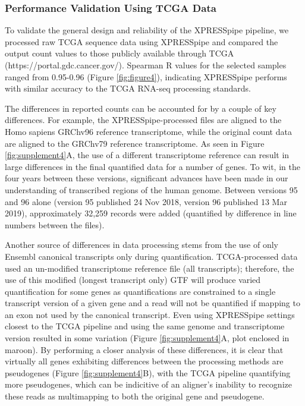 \documentclass[10pt, oneside]{article}
\begin{document}
\subsubsection{Performance Validation Using TCGA Data}
To validate the general design and reliability of the XPRESSpipe pipeline, we processed raw TCGA sequence data using XPRESSpipe and compared the output count values to those publicly available through TCGA (https://portal.gdc.cancer.gov/). Spearman R values for the selected samples ranged from 0.95-0.96 (Figure \ref{fig:figure4}), indicating XPRESSpipe performs with similar accuracy to the TCGA RNA-seq processing standards. \par

The differences in reported counts can be accounted for by a couple of key differences. For example, the XPRESSpipe-processed files are aligned to the Homo sapiens GRChv96 reference transcriptome, while the original count data are aligned to the GRChv79 reference transcriptome. As seen in Figure \ref{fig:supplement4}A, the use of a different transcriptome reference can result in large differences in the final quantified data for a number of genes. To wit, in the four years between these versions, significant advances have been made in our understanding of transcribed regions of the human genome. Between versions 95 and 96 alone (version 95 published 24 Nov 2018, version 96 published 13 Mar 2019), approximately 32,259 records were added (quantified by difference in line numbers between the files). \par

Another source of differences in data processing stems from the use of only Ensembl canonical transcripts only during quantification. TCGA-processed data used an un-modified transcriptome reference file (all transcripts); therefore, the use of this modified (longest transcript only) GTF will produce varied quantification for some genes as quantifications are constrained to a single transcript version of a given gene and a read will not be quantified if mapping to an exon not used by the canonical transcript. Even using XPRESSpipe settings closest to the TCGA pipeline and using the same genome and transcriptome version resulted in some variation (Figure \ref{fig:supplement4}A, plot enclosed in maroon). By performing a closer analysis of these differences, it is clear that virtually all genes exhibiting differences between the processing methods are pseudogenes (Figure \ref{fig:supplement4}B), with the TCGA pipeline quantifying more pseudogenes, which can be indicitive of an aligner's inability to recognize these reads as multimapping to both the original gene and pseudogene.  \par
\end{document}
